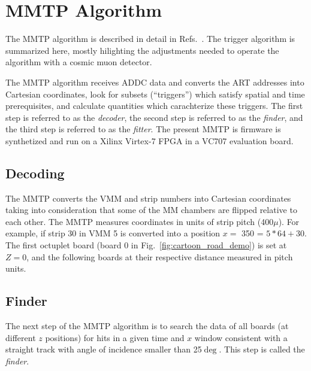\section{MMTP Algorithm}
\label{sec:alg}

The MMTP algorithm  is described in detail in Refs.~\cite{brian,steve}. The trigger algorithm is summarized here,
mostly hilighting the adjustments needed to operate the algorithm with a cosmic muon detector.

The MMTP algorithm receives ADDC data and converts the ART addresses into Cartesian coordinates, look for subsets (``triggers'') which
 satisfy spatial and time prerequisites, and calculate quantities which carachterize these triggers.
 The first step is referred to as the \textit{decoder}, the second step is referred to as the \textit{finder},
 and the third step is referred to as the \textit{fitter}.
 The present MMTP is firmware is synthetized and run on a Xilinx Virtex-7 FPGA in a VC707 evaluation board.
 

\subsection{Decoding}
\label{sec:alg-decode}

 The MMTP converts the VMM and strip numbers into Cartesian coordinates 
 taking into consideration that some of the MM chambers are flipped relative to each other.
 The MMTP measures coordinates in units of strip pitch (400$\mu$).
 For example, if   strip 30 in VMM 5 is  converted into  a position 
 $x=$ 350 = $5*64 + 30$. 
The first octuplet board (board 0 in Fig.~\ref{fig:cartoon_road_demo})  is set at $Z=0$, and the following boards at their respective distance measured in pitch
 units.

\subsection{Finder}
\label{sec:alg-finder}
The next step of the MMTP algorithm is to search the data of all boards (at different $z$ positions)
for hits in a given time and $x$ window consistent with a straight track with angle of incidence smaller than 25$\deg$.
 This step is called the \textit{finder}.

